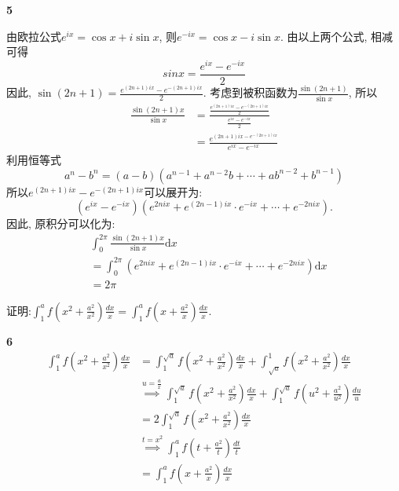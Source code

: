 \documentclass[12pt]{article}
\newenvironment{solution}[2][Solution]{\begin{trivlist}
\item[\hskip \labelsep {\bfseries #1}]}{\end{trivlist}}
\newenvironment{problem}[2][Problem]{\begin{trivlist}
\item[\hskip \labelsep {\bfseries #1}\hskip \labelsep {\bfseries #2.}]}{\end{trivlist}}
\begin{document}
\begin{solution}{5} \textbf{5}
    
    由欧拉公式$e^{ix} = \cos x + i\sin x$, 则$e^{-ix} = \cos x - i\sin x$. 由以上两个公式, 相减可得
    \begin{equation} \label{}
        sinx = \frac{e^{ix} - e^{-ix}}{2}    
    \end{equation}
    因此, $\sin(2n+1) = \frac{e^{(2n+1)ix} - e^{-(2n+1)ix}}{2}$. 考虑到被积函数为$\frac{\sin(2n+1)}{\sin x}$, 所以
    \[
        \begin{aligned}
            \frac{\sin(2n+1)x}{\sin x} &= \frac{\frac{e^{(2n+1)ix}-e^{-(2n+1)ix}}{2}}{\frac{e^{ix} - e^{-ix}}{2}} \\
            &= \frac{e^{(2n+1)ix - e^{-(2n+1)ix}}}{e^{ix} - e^{-ix}}    
        \end{aligned}
    \]
    利用恒等式
    \[
        a^n - b^n = (a-b)(a^{n-1} + a^{n-2}b + \cdots + ab^{n-2} + b^{n-1})    
    \]
    所以$e^{(2n+1)ix} - e^{-(2n+1)ix}$可以展开为:
    \[
        (e^{ix} - e^{-ix})(e^{2nix} + e^{(2n-1)ix}\cdot e^{-ix} + \cdots + e^{-2nix}).    
    \]
    因此, 原积分可以化为:
    \[
        \begin{aligned}
            &\int_0^{2\pi} \frac{\sin(2n+1)x}{\sin x}\mathrm{d}x \\
            &= \int_0^{2\pi} \left( e^{2nix} + e^{(2n-1)ix}\cdot e^{-ix} + \cdots + e^{-2nix} \right)\mathrm{d}x \\
            &= 2\pi
        \end{aligned}    
    \]
\end{solution}

\begin{problem}{6}
证明:$\int_1^a f(x^2+\frac{a^2}{x^2})\frac{dx}{x} = \int_1^a f(x+\frac{a^2}{x})\frac{dx}{x}.$
\end{problem}

\begin{solution}{6} \textbf{6}
\[
\begin{aligned}
	\int_1^a f(x^2 + \frac{a^2}{x^2})\frac{dx}{x} &= \int_1^{\sqrt{a}} f(x^2+\frac{a^2}{x^2})\frac{dx}{x} + \int_{\sqrt{a}}^1 f(x^2+\frac{a^2}{x^2})\frac{dx}{x} \\ &\stackrel{u=\frac{a}{x}}\implies \int_1^{\sqrt{a}} f(x^2+\frac{a^2}{x^2})\frac{dx}{x} + \int_1^{\sqrt{a}}f(u^2+\frac{a^2}{u^2})\frac{du}{u} \\
&=2\int_1^{\sqrt{a}} f(x^2+\frac{a^2}{x^2})\frac{dx}{x}\\
&\stackrel{t=x^2}\implies \int_1^a f(t+\frac{a^2}{t})\frac{dt}{t}\\
&=\int_1^a f(x+\frac{a^2}{x})\frac{dx}{x}
\end{aligned}
\]
\end{solution}
\end{document}
